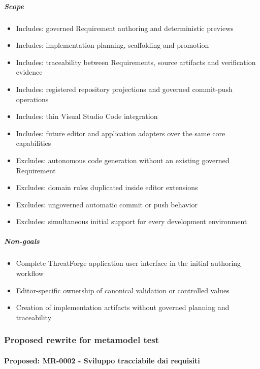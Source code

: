 \documentclass[
  10pt,
]{article}
\providecommand{\tightlist}{%
  \setlength{\itemsep}{0pt}\setlength{\parskip}{0pt}}
\begin{document}
\subparagraph{Scope}\label{scope-1}

\begin{itemize}
\tightlist
\item
  Includes: governed Requirement authoring and deterministic previews
\item
  Includes: implementation planning, scaffolding and promotion
\item
  Includes: traceability between Requirements, source artifacts and
  verification evidence
\item
  Includes: registered repository projections and governed commit-push
  operations
\item
  Includes: thin Visual Studio Code integration
\item
  Includes: future editor and application adapters over the same core
  capabilities
\item
  Excludes: autonomous code generation without an existing governed
  Requirement
\item
  Excludes: domain rules duplicated inside editor extensions
\item
  Excludes: ungoverned automatic commit or push behavior
\item
  Excludes: simultaneous initial support for every development
  environment
\end{itemize}

\subparagraph{Non-goals}\label{non-goals-1}

\begin{itemize}
\tightlist
\item
  Complete ThreatForge application user interface in the initial
  authoring workflow
\item
  Editor-specific ownership of canonical validation or controlled values
\item
  Creation of implementation artifacts without governed planning and
  traceability
\end{itemize}

\subsubsection{Proposed rewrite for metamodel
test}\label{proposed-rewrite-for-metamodel-test-1}

\paragraph{Proposed: MR-0002 - Sviluppo tracciabile dai
requisiti}\label{proposed-mr-0002---sviluppo-tracciabile-dai-requisiti}
\end{document}

